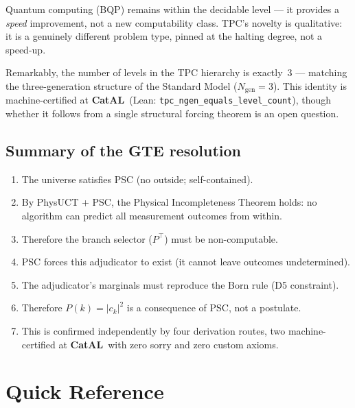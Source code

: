 \documentclass[11pt,a4paper]{article}
\newcommand{\lean}[1]{\texttt{#1}}
\newcommand{\CatAL}{\textbf{CatAL}}
\begin{document}
Quantum computing (BQP) remains within the decidable level --- it provides a
\emph{speed} improvement, not a new computability class.  TPC's novelty is
qualitative: it is a genuinely different problem type, pinned at the halting degree,
not a speed-up.

Remarkably, the number of levels in the TPC hierarchy is exactly~3 ---
matching the three-generation structure of the Standard Model ($N_{\mathrm{gen}} = 3$).
This identity is machine-certified at \CatAL\ (Lean:
\lean{tpc\_ngen\_equals\_level\_count}), though whether it follows
from a single structural forcing theorem is an open question.

\subsection{Summary of the GTE resolution}

\begin{tcolorbox}[colback=boxgreen,colframe=green!50!black,title=GTE resolution of the measurement problem]
\begin{enumerate}
  \item The universe satisfies PSC (no outside; self-contained).
  \item By PhysUCT + PSC, the Physical Incompleteness Theorem holds: no algorithm
    can predict all measurement outcomes from within.
  \item Therefore the branch selector ($P^\top$) must be non-computable.
  \item PSC forces this adjudicator to exist (it cannot leave outcomes undetermined).
  \item The adjudicator's marginals must reproduce the Born rule (D5 constraint).
  \item Therefore $P(k) = |c_k|^2$ is a consequence of PSC, not a postulate.
  \item This is confirmed independently by four derivation routes,
    two machine-certified at \CatAL\ with zero sorry and zero custom axioms.
\end{enumerate}
\end{tcolorbox}

\section{Quick Reference}
\end{document}
